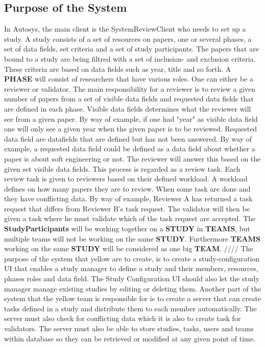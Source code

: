 \subsection{Purpose of the System}
In Autosys, the main client is the SystemReviewClient who needs to set up a study. A study consists of a set of resources on papers,  one or several phases, a set of data fields, set criteria and a set of study participants. The papers that are bound to a study are being filtred with a set of inclusion- and exclusion criteria. These criteria are based on data fields such as year, title and so forth. A \textbf{PHASE} will consist of researchers that have various roles. One can either be a reviewer or validator. The main responsibility for a reviewer is to review a given number of papers from a set of visible data fields and requested data fields that are defined in each phase. Visible data fields determines what the reviewer will see from a given paper. By way of example, if one had "year" as visible data field one will only see a given year when the given paper is to be reviewed. Requested data field are datafields that are defined but has not been answered. By way of example, a requested data field could be defined as a data field about whether a paper is about soft engineering or not. The reviewer will answer this based on the given set visible data fields. This process is regarded as a review task. Each review task is given to reviewers based on their defined workload. A workload defines on how many papers they are to review. When some task are done and they have conflicting data. By way of example, Reviewer A has returned a task request that differs from Reviewer B's task request. The validator will then be given a task where he must validate which of the task request are accepted. The \textbf{StudyParticipants} will be working together on a \textbf{STUDY} in \textbf{TEAMS}, but multiple teams will not be working on the same \textbf{STUDY}. Furthermore \textbf{TEAMS} working on the same \textbf{STUDY} will be considered as one big \textbf{TEAM}. //// The purpose of the system that yellow are to create, is to create a study-configuration UI that enables a study manager to define a study and their members, resources, phases roles and data field. The Study Configuration UI should also let the study manager manage existing studies by editing or deleting them. Another part of the system that the yellow team is responsible for is to create a server that can create tasks defined in a study and distribute them to each member automatically. The server must also check for conflicting data which it is also to create task for validators. The server must also be able to store studies, tasks, users and teams within database so they can be retrieved or modified at any given point of time.
